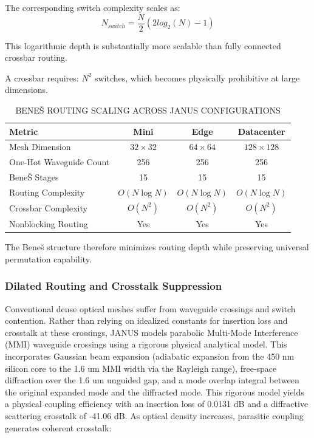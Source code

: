 \documentclass[journal]{IEEEtran}
\begin{document}
The corresponding switch complexity scales as:
\begin{equation}
N_{switch} = \frac{N}{2} (2 log_2(N ) - 1)
\end{equation}

This logarithmic depth is substantially more scalable than fully connected crossbar routing.

A crossbar requires: $N^{2}$ switches, which becomes physically prohibitive at large dimensions.

\begin{table}[htbp]
\centering
\small
\setlength{\tabcolsep}{3pt}
\caption{BENE\v{S} ROUTING SCALING ACROSS JANUS CONFIGURATIONS}
\label{tab:table5}
\begin{tabular}{lccc}
\toprule
Metric & Mini & Edge & Datacenter \\
\midrule
Mesh Dimension & $32 \times 32$ & $64 \times 64$ & $128 \times 128$ \\
One-Hot Waveguide Count & 256 & 256 & 256 \\
Bene\v{S} Stages & 15 & 15 & 15 \\
Routing Complexity & $O(N\log N)$ & $O(N\log N)$ & $O(N\log N)$ \\
Crossbar Complexity & $O(N^{2})$ & $O(N^{2})$ & $O(N^{2})$ \\
Nonblocking Routing & Yes & Yes & Yes \\
\bottomrule
\end{tabular}
\end{table}

The Beneš structure therefore minimizes routing depth while preserving universal permutation capability.

\subsubsection{\textbf{Dilated Routing and Crosstalk Suppression}}
Conventional dense optical meshes suffer from waveguide crossings and switch contention. Rather than relying on idealized constants for insertion loss and crosstalk at these crossings, JANUS models parabolic Multi-Mode Interference (MMI) waveguide crossings using a rigorous physical analytical model. This incorporates Gaussian beam expansion (adiabatic expansion from the 450 nm silicon core to the 1.6 um MMI width via the Rayleigh range), free-space diffraction over the 1.6 um unguided gap, and a mode overlap integral between the original expanded mode and the diffracted mode. This rigorous model yields a physical coupling efficiency with an insertion loss of 0.0131 dB and a diffractive scattering crosstalk of -41.06 dB. As optical density increases, parasitic coupling generates coherent crosstalk:
\end{document}
